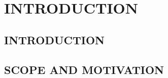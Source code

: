 \chapter{INTRODUCTION}
\vspace{-1 cm}

\section{INTRODUCTION}
\noindent

\section{SCOPE AND MOTIVATION}
\noindent
